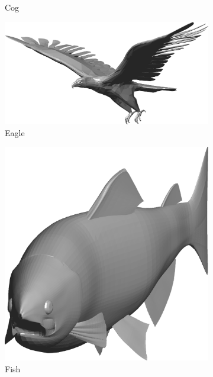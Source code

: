 \begin{figure}
\begin{subfigure}[t]{0.19\linewidth}
		\caption{Cog} 	
	\end{subfigure}
	\begin{subfigure}[t]{0.19\linewidth} \centering
		\includegraphics[width=1\linewidth]{./fig/eval/09eagle.png}  
		\caption{Eagle} 	
	\end{subfigure} 
	\begin{subfigure}[t]{0.19\linewidth} \centering
		\includegraphics[width=1\linewidth]{./fig/eval/10fish.png}  
		\caption{Fish} 	
	\end{subfigure} \\ 
	\begin{subfigure}[t]{0.19\linewidth} \centering

\end{subfigure}
\end{figure}
